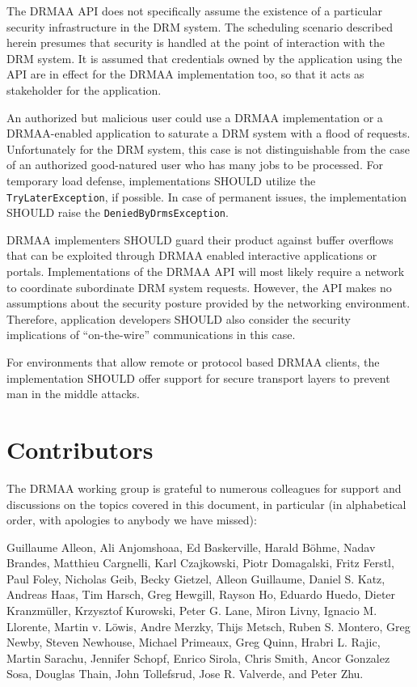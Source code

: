 \documentclass{article}
\newcommand{\h}[1]{\lstinline|#1|}
\begin{document}
The DRMAA API does not specifically assume the existence of a particular security infrastructure in the DRM system. The scheduling scenario described herein presumes that security is handled at the point of interaction with the DRM system. It is assumed that credentials owned by the application using the API are in effect for the DRMAA implementation too, so that it acts as stakeholder for the application. 

An authorized but malicious user could use a DRMAA implementation or a DRMAA-enabled application to saturate a DRM system with a flood of requests. Unfortunately for the DRM system, this case is not distinguishable from the case of an authorized good-natured user who has many jobs to be processed. For temporary load defense, implementations SHOULD utilize the \h{TryLaterException}, if possible. In case of permanent issues, the implementation SHOULD raise the \h{DeniedByDrmsException}.

DRMAA implementers SHOULD guard their product against buffer overflows that can be exploited through DRMAA enabled interactive applications or portals. Implementations of the DRMAA API will most likely require a network to coordinate subordinate DRM system requests. However, the API makes no assumptions about the security posture provided by the networking environment. Therefore, application developers SHOULD also consider the security implications of \enquote{on-the-wire} communications in this case.

For environments that allow remote or protocol based DRMAA clients, the implementation SHOULD offer support for secure transport layers to prevent man in the middle attacks. 

\section{Contributors}


The DRMAA working group is grateful to numerous colleagues for support and discussions on the topics covered in this document, in particular (in alphabetical order, with apologies to anybody we have missed): 

Guillaume Alleon, 
Ali Anjomshoaa, 
Ed Baskerville, 
Harald Böhme, 
Nadav Brandes,
Matthieu Cargnelli, 
Karl Czajkowski, 
Piotr Domagalski, 
Fritz Ferstl, 
Paul Foley, 
Nicholas Geib, 
Becky Gietzel, 
Alleon Guillaume, 
Daniel S. Katz,
Andreas Haas,
Tim Harsch, 
Greg Hewgill, 
Rayson Ho, 
Eduardo Huedo, 
Dieter Kranzmüller, 
Krzysztof Kurowski, 
Peter G. Lane, 
Miron Livny, 
Ignacio M. Llorente, 
Martin v. Löwis, 
Andre Merzky, 
Thijs Metsch,
Ruben S. Montero, 
Greg Newby, 
Steven Newhouse, 
Michael Primeaux, 
Greg Quinn, 
Hrabri L. Rajic,
Martin Sarachu, 
Jennifer Schopf, 
Enrico Sirola, 
Chris Smith, 
Ancor Gonzalez Sosa, 
Douglas Thain, 
John Tollefsrud, 
Jose R. Valverde, 
and Peter Zhu.
\end{document}

